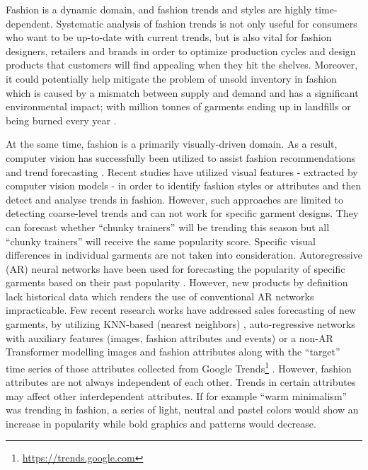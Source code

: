 \documentclass{article}
\begin{document}
Fashion is a dynamic domain, and fashion trends and styles are highly time-dependent. Systematic analysis of fashion trends is not only useful for consumers who want to be up-to-date with current trends, but is also vital for fashion designers, retailers and brands in order to optimize production cycles and design products that customers will find appealing when they hit the shelves. 
Moreover, it could potentially help mitigate the problem of unsold inventory in fashion which is caused by a mismatch between supply and demand \cite{ekambaram2020attention} and has a significant environmental impact;  with million tonnes of garments ending up in landfills or being burned every year \cite{niinimaki2020environmental}.

At the same time, fashion is a primarily visually-driven domain.
As a result, computer vision has successfully been utilized to assist fashion recommendations and trend forecasting \cite{cheng2021fashion}.
Recent studies have utilized visual features - extracted by computer vision models - in order to identify fashion styles \cite{al2017fashion} or attributes \cite{mall2019geostyle} and then detect and analyse trends in fashion. 
However, such approaches are limited to detecting coarse-level trends and can not work for specific garment designs. 
They can forecast whether ``chunky trainers'' will be trending this season but all ``chunky trainers'' will receive the same popularity score. Specific visual differences in individual garments are not taken into consideration.  
Autoregressive (AR) neural networks have been used for forecasting the popularity of specific garments based on their past popularity \cite{lo2019dressing}. However, new products by definition lack historical data which renders the use of conventional AR networks impracticable. 
Few recent research works have addressed sales forecasting of new garments, by utilizing KNN-based (nearest neighbors) \cite{craparotta2019siamese}, auto-regressive networks with auxiliary features (images, fashion attributes and events) \cite{ekambaram2020attention} or a non-AR Transformer modelling images and fashion attributes along with the ``target'' time series of those attributes collected from Google Trends\footnote{\url{https://trends.google.com}} \cite{skenderi2021well}. 
However, fashion attributes are not always independent of each other. Trends in certain attributes may affect other interdependent attributes. If for example ``warm minimalism'' was trending in fashion, a series of light, neutral and pastel colors would show an increase in popularity while bold graphics and patterns would decrease.
\end{document}
